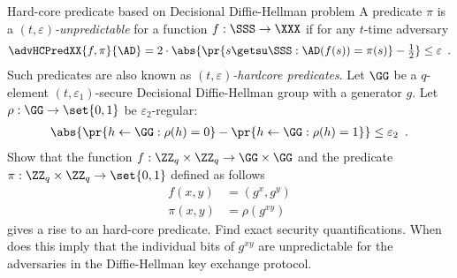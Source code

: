 \documentclass{crypto-exercise}
\author{Sven Laur}
\begin{document}
\begin{exercise}{Hard-core predicate based on Decisional Diffie-Hellman problem}
A predicate $\pi$ is a \emph{$(t,\varepsilon)$-unpredictable}  for a function
  $f:\SSS\to\XXX$ if for any $t$-time adversary
  \begin{align*}
    \advHCPredXX{f,\pi}{\AD}%
    =2\cdot\abs{\pr{s\getsu\SSS:\AD(f(s))=\pi(s)}-{\textstyle\frac{1}{2}}}\leq\varepsilon\enspace.
\end{align*}
Such predicates are also known as \emph{$(t,\varepsilon)$-hardcore predicates}. Let $\GG$ be a $q$-element $(t,\varepsilon_1)$-secure Decisional Diffie-Hellman group with a generator $g$. Let $\rho:\GG\to\set{0,1}$ be $\varepsilon_2$-regular:
\begin{align*}
\abs{\pr{h\gets\GG: \rho(h)=0}- \pr{h\gets\GG: \rho(h)=1}}\leq \varepsilon_2\enspace.
\end{align*}
Show that the function $f:\ZZ_q\times\ZZ_q\to\GG\times\GG$ and the predicate $\pi: \ZZ_q\times\ZZ_q\to\set{0,1}$ defined as follows
\begin{align*}
f(x,y)&=(g^x, g^y)\\
\pi(x,y)&= \rho(g^{xy})
\end{align*}  
gives a rise to an hard-core predicate. Find exact security quantifications. When does this imply that the individual bits of $g^{xy}$ are unpredictable for the adversaries in the Diffie-Hellman key exchange protocol.
\end{exercise}
\begin{solution}
\end{solution}
\end{document}
